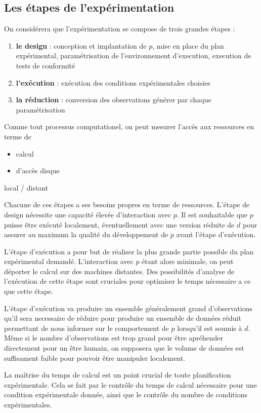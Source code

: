 \subsection{Les étapes de l'expérimentation}

On considérera que l'expérimentation se compose de trois grandes étapes :
\begin{enumerate}
  \item \textbf{le design} : conception et implantation de $p$, mise en place du plan expérimental, paramétrisation de l'environnement d'execution, execution de tests de conformité
  \item \textbf{l'exécution} : exécution des conditions expérimentales choisies
  \item \textbf{la réduction} : conversion des observations générer par chaque paramétrisation
\end{enumerate}

Comme tout processus computationel, on peut mesurer l'accès aux ressources en terme de
\begin{itemize}
  \item calcul
  \item d'accès disque
\end{itemize}

local / distant

Chacune de ces étapes a ses besoins propres en terme de ressources. L'étape de design nécessite une capacité élevée d'interaction avec $p$. Il est souhaitable que $p$ puisse être exécuté localement, éventuellement avec une version réduite de $d$ pour assurer au maximum la qualité du développement de $p$ avant l'étape d'exécution.

L'étape d'exécution a pour but de réaliser la plus grande partie possible du plan expérimental demandé. L'interaction avec $p$ étant alors minimale, on peut déporter le calcul sur des machines distantes. Des possibilités d'analyse de l'exécution de cette étape sont cruciales pour optimiser le temps nécessaire a ce que cette étape.

L'étape d'exécution va produire un ensemble généralement grand d'observations qu'il sera necessaire de réduire pour produire un ensemble de données réduit permettant de nous informer sur le comportement de $p$ lorsqu'il est soumis à $d$. Même si le nombre d'observations est trop grand pour être apréhender directement pour un être humain, on supposera que le volume de données est suffisament faible pour pouvoir être manipuler localement.

La maîtrise du temps de calcul est un point crucial de toute planification expérimentale. Cela se fait par le contrôle du temps de calcul nécessaire pour une condition expérimentale donnée, ainsi que le contrôle du nombre de conditions expérimentales.

